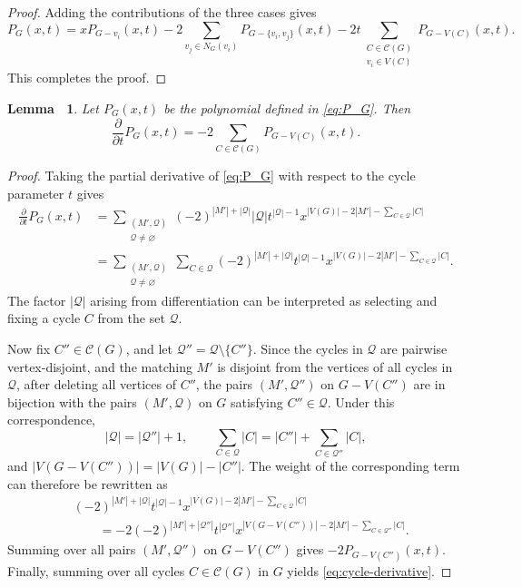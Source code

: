 \documentclass[11pt, a4paper]{article}
\theoremstyle{plain}
\newtheorem{lemma}{Lemma\ }[section]
\begin{document}
\begin{proof}
Adding the contributions of the three cases gives
\[
P_G(x,t)
=
 xP_{G-v_i}(x,t)
-2\sum_{v_j\in N_G(v_i)}P_{G-\{v_i,v_j\}}(x,t)
-2t\sum_{\substack{C\in\mathcal{C}(G)\\v_i\in V(C)}}P_{G-V(C)}(x,t).
\]
This completes the proof.
\end{proof}

\begin{lemma}\label{lem:cycle-derivative}
Let $P_G(x,t)$ be the polynomial defined in \eqref{eq:P_G}. Then
\begin{equation}\label{eq:cycle-derivative}
 \frac{\partial}{\partial t}P_G(x,t)
 =-2\sum_{C\in\mathcal{C}(G)}P_{G-V(C)}(x,t).
\end{equation}
\end{lemma}
\begin{proof}
Taking the partial derivative of \eqref{eq:P_G} with respect to the cycle parameter $t$ gives
\[
\begin{aligned}
\frac{\partial}{\partial t}P_G(x,t)
&=
\sum_{\substack{(M',\mathcal{Q})\\\mathcal{Q}\neq\varnothing}}
(-2)^{|M'|+|\mathcal{Q}|}
|\mathcal{Q}|t^{|\mathcal{Q}|-1}
x^{|V(G)|-2|M'|-\sum_{C\in \mathcal{Q}}|C|}                                      \\
&=
\sum_{\substack{(M',\mathcal{Q})\\\mathcal{Q}\neq\varnothing}}
\sum_{C\in \mathcal{Q}}
(-2)^{|M'|+|\mathcal{Q}|}
t^{|\mathcal{Q}|-1}
x^{|V(G)|-2|M'|-\sum_{C\in \mathcal{Q}}|C|}.
\end{aligned}
\]
The factor $|\mathcal{Q}|$ arising from differentiation can be interpreted as
selecting and fixing a cycle $C$ from the set $\mathcal{Q}$.

Now fix $C''\in\mathcal{C}(G)$, and let $\mathcal{Q}''=\mathcal{Q}\setminus\{C''\}$.
Since the cycles in $\mathcal{Q}$ are pairwise vertex-disjoint,
and the matching $M'$ is disjoint from the vertices of all cycles in $\mathcal{Q}$,
after deleting all vertices of $C''$, the pairs $(M',\mathcal{Q}'')$ on $G-V(C'')$ are in bijection with
the pairs $(M',\mathcal{Q})$ on $G$ satisfying $C''\in\mathcal{Q}$.
Under this correspondence,
\[
|\mathcal{Q}|=|\mathcal{Q}''|+1,
\qquad
\sum_{C\in \mathcal{Q}}|C|
=
|C''|+\sum_{C\in \mathcal{Q}''}|C|,
\]
and $|V(G-V(C''))|=|V(G)|-|C''|$.
The weight of the corresponding term can therefore be rewritten as
\[
\begin{aligned}
&(-2)^{|M'|+|\mathcal{Q}|}
t^{|\mathcal{Q}|-1}
x^{|V(G)|-2|M'|-\sum_{C\in \mathcal{Q}}|C|}                                      \\
&\qquad
=
-2(-2)^{|M'|+|\mathcal{Q}''|}
t^{|\mathcal{Q}''|}
x^{|V(G-V(C''))|-2|M'|-\sum_{C\in \mathcal{Q}''}|C|}.
\end{aligned}
\]
Summing over all pairs $(M',\mathcal{Q}'')$ on $G-V(C'')$ gives $-2P_{G-V(C'')}(x,t)$.
Finally, summing over all cycles $C\in\mathcal{C}(G)$ in $G$ yields \eqref{eq:cycle-derivative}.
\end{proof}
\end{document}
